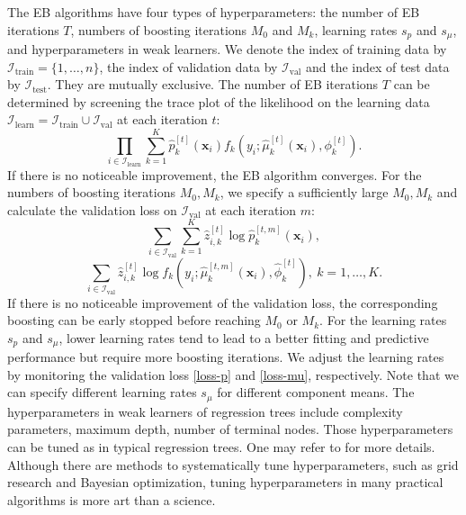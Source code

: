 \documentclass[11pt]{article}
\numberwithin{equation}{section}
\def\bx{\boldsymbol{x}}
\begin{document}
The EB algorithms have four types of hyperparameters: the number of EB iterations $T$, numbers of boosting iterations $M_0$ and $M_k$, learning rates $s_p$ and $s_\mu$, and hyperparameters in weak learners. 
We denote the index of training data by $\mathcal{I}_\text{train}=\{1,\ldots,n\}$, the index of validation data by $\mathcal{I}_\text{val}$ and the index of test data by $\mathcal{I}_\text{test}$. They are mutually exclusive.
The number of EB iterations $T$ can be determined by screening the trace plot of the likelihood on the learning data $\mathcal{I}_\text{learn}=\mathcal{I}_\text{train}\cup\mathcal{I}_\text{val}$ at each iteration $t$:
$$\prod_{i\in\mathcal{I}_\text{learn}}\sum_{k=1}^K\hat{p}_k^{[t]}(\bx_i)f_k(y_i;\hat{\mu}_k^{[t]}(\bx_i),\phi_k^{[t]}).$$
If there is no noticeable improvement, the EB algorithm converges.
For the numbers of boosting iterations  {$M_0,M_k$}, we specify a sufficiently large $M_0,M_k$ and calculate the validation loss on $\mathcal{I}_\text{val}$ at each iteration $m$:
\begin{equation}\label{loss-p}
\sum_{i\in\mathcal{I}_\text{val}}\sum_{k=1}^K \hat{z}_{i,k}^{[t]}\log \hat{p}_k^{[t,m]}(\bx_i),
\end{equation}
\begin{equation}\label{loss-mu}
\sum_{i\in\mathcal{I}_\text{val}} \hat{z}^{[t]}_{i,k}\log f_k\left(y_i;\hat{\mu}_k^{[t,m]}\left(\bx_i\right),\hat{\phi}_k^{[t]}\right), ~ k=1,\ldots,K.
\end{equation}
If there is no noticeable improvement of the validation loss, the corresponding boosting can be early stopped before reaching $M_0$ or $M_k$.  
For the learning rates {$s_p$} and $s_\mu$, lower learning rates tend to lead to a better fitting and predictive performance but require more boosting iterations.
We adjust the learning rates by monitoring the validation loss \eqref{loss-p} and \eqref{loss-mu}, respectively.
Note that we can specify different learning rates $s_\mu$ for different component means.
The hyperparameters in weak learners of regression trees include complexity parameters, maximum depth, number of terminal nodes.
Those hyperparameters can be tuned as in typical regression trees. One may refer to \citet{hastie2009elements} for more details.
Although there are methods to systematically tune hyperparameters, such as grid research and Bayesian optimization, tuning hyperparameters in many practical algorithms is more art than a science.
\end{document}
